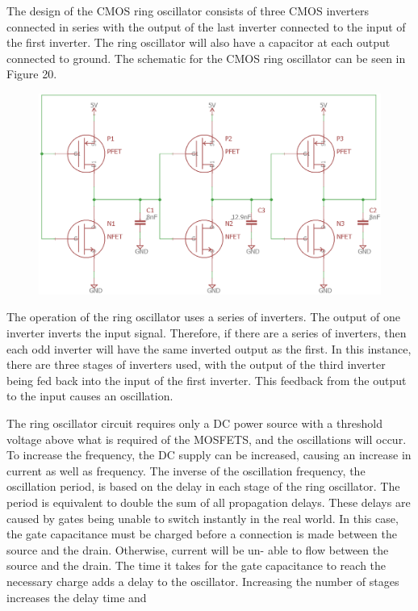 
The design of the CMOS ring oscillator consists of three CMOS inverters connected in series with the
output of the last inverter connected to the input of the first inverter. The ring oscillator will also have a
capacitor at each output connected to ground. The schematic for the CMOS ring oscillator can be seen in
Figure 20.


\begin{figure}[H]
	\centering
	\includegraphics[width=0.5\linewidth]{CircuitDevelopment/RingOscillatorCMOSexp.png}
	\caption{}
	\label{fig:ringoscillatorcmosexp}
\end{figure}


The operation of the ring oscillator uses a series of inverters. The output of one inverter inverts the input signal. Therefore, if there are a series of inverters, then each odd inverter will have the same inverted output as the first. In this instance, there are three stages of inverters used, with the output of the third inverter being fed back into the input of the first inverter. This feedback from the output to the input causes an oscillation.

The ring oscillator circuit requires only a DC power source with a threshold voltage above what is required of the MOSFETS, and the oscillations will occur. To increase the frequency, the DC supply can be increased, causing an increase in current as well as frequency. The inverse of the oscillation frequency, the oscillation period, is based on the delay in each stage of the
ring oscillator. The period is equivalent to double the sum of all propagation delays. These delays are
caused by gates being unable to switch instantly in the real world. In this case, the gate capacitance must be charged before a connection is made between the source and the drain. Otherwise, current will be un-
able to flow between the source and the drain. The time it takes for the gate capacitance to reach the necessary charge adds a delay to the oscillator. Increasing the number of stages increases the delay time and


